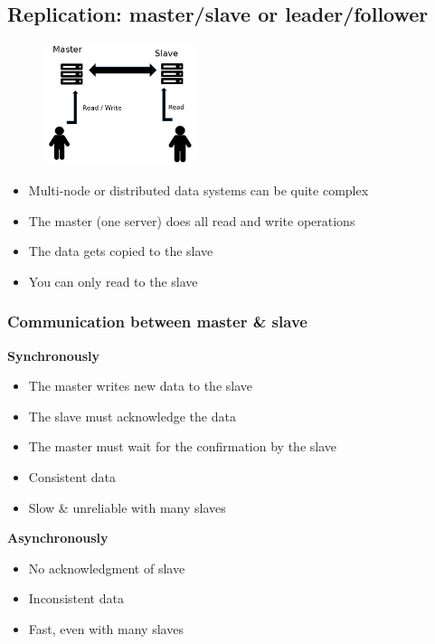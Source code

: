 \documentclass{article}
\begin{document}
\subsection{Replication: master/slave or leader/follower}

\begin{figure}[H]
    \centering
    \includegraphics[width=0.4\textwidth]{replication-master-slave.png}
    \caption{}
\end{figure}

\begin{itemize}
    \item Multi-node or distributed data systems can be quite complex
    \item The master (one server) does all read and write operations
    \item The data gets copied to the slave
    \item You can only read to the slave
\end{itemize}

\subsubsection{Communication between master \& slave}

\textbf{Synchronously}

\begin{itemize}
    \item The master writes new data to the slave
    \item The slave must acknowledge the data
    \item The master must wait for the confirmation by the slave
    \item Consistent data
    \item Slow \& unreliable with many slaves
\end{itemize}

\textbf{Asynchronously}

\begin{itemize}
    \item No acknowledgment of slave
    \item Inconsistent data
    \item Fast, even with many slaves
\end{itemize}
\end{document}
